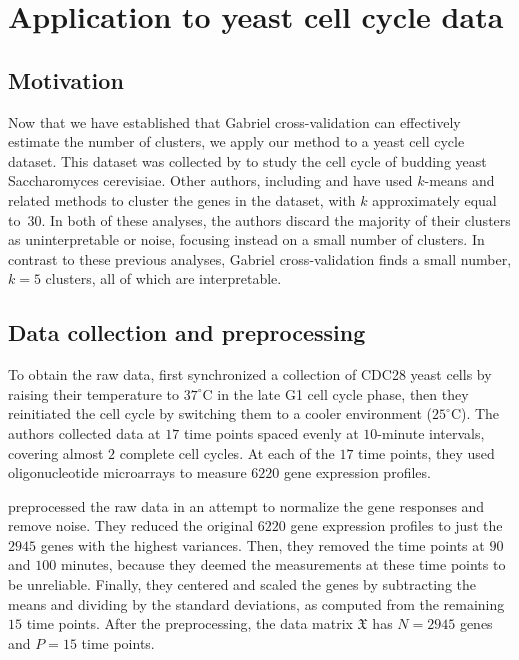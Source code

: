 \documentclass[12pt]{article}
\newcommand{\dataX}{\mathfrak{X}}
\begin{document}
\section{Application to yeast cell cycle data}
\label{sec:application-yeast}

\subsection{Motivation}

Now that we have established that Gabriel cross-validation can effectively
estimate the number of clusters, we apply our method to a yeast cell cycle
dataset. This dataset was collected by \cite{cho1998genome} to study the cell
cycle of budding yeast Saccharomyces cerevisiae. Other authors, including
\citet{tavazoie1999systematic} and \citet{dortet2008model} have used $k$-means
and related methods to cluster the genes in the dataset, with $k$
approximately equal to~30. In both of these analyses, the authors discard the
majority of their clusters as uninterpretable or noise, focusing instead on a
small number of clusters. In contrast to these previous analyses, Gabriel
cross-validation finds a small number, $k = 5$ clusters, all of which are
interpretable.


\subsection{Data collection and preprocessing}

To obtain the raw data, \citet{cho1998genome} first synchronized a collection
of CDC28 yeast cells by raising their temperature to $37^\circ$C in the late
G1 cell cycle phase, then they reinitiated the cell cycle by switching them to
a cooler environment ($25^\circ$C). The authors collected data at $17$ time
points spaced evenly at $10$-minute intervals, covering almost $2$ complete
cell cycles. At each of the $17$ time points, they used
oligonucleotide microarrays to measure $6220$ gene expression profiles.


\citet{tavazoie1999systematic} preprocessed the raw data in an attempt to
normalize the gene responses and remove noise. They reduced the original
$6220$ gene expression profiles to just the $2945$ genes with the highest
variances. Then, they removed the time points at $90$ and $100$ minutes,
because they deemed the measurements at these time points to be unreliable.
Finally, they centered and scaled the genes by subtracting the means and
dividing by the standard deviations, as computed from the remaining $15$ time
points.  After the preprocessing, the data matrix $\dataX$ has $N = 2945$
genes and $P = 15$ time points.
\end{document}
